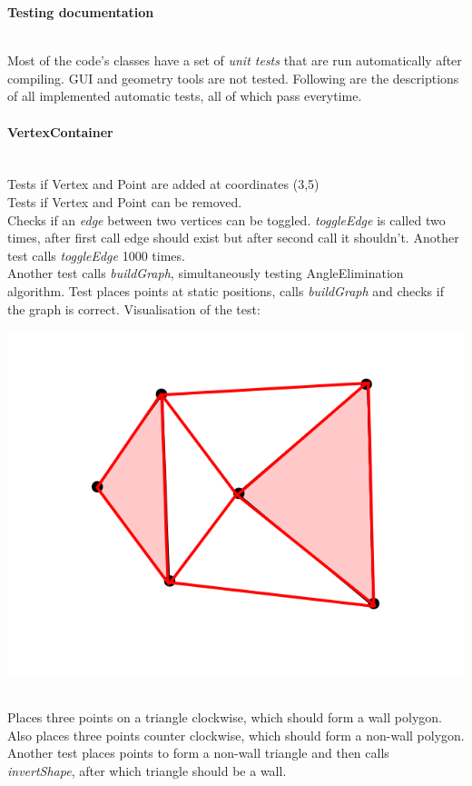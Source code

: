 \documentclass[a4paper,12pt]{article}
\begin{document}
\centerline{\huge \textbf{Testing documentation}} \hspace*{\fill}
\\
Most of the code's classes have a set of \emph{unit tests} that are run automatically after compiling. GUI and geometry tools are not tested. Following are the descriptions of all implemented automatic tests, all of which pass everytime.\\

\paragraph{\large VertexContainer} \hspace{0pt} \\
Tests if Vertex and Point are added at coordinates (3,5)\\
Tests if Vertex and Point can be removed.\\
Checks if an \emph{edge} between two vertices can be toggled. \emph{toggleEdge} is called two times, after first call edge should exist but after second call it shouldn't. Another test calls \emph{toggleEdge} 1000 times.\\
Another test calls \emph{buildGraph}, simultaneously testing AngleElimination algorithm. Test places points at static positions, calls \emph{buildGraph} and checks if the graph is correct. Visualisation of the test:\\
\centerline{\includegraphics[scale=0.25]{vc.png}} \hspace*{\fill} \\
Places three points on a triangle clockwise, which should form a wall polygon. Also places three points counter clockwise, which should form a non-wall polygon.\\
Another test places points to form a non-wall triangle and then calls\\ \emph{invertShape}, after which triangle should be a wall.\\
\end{document}
